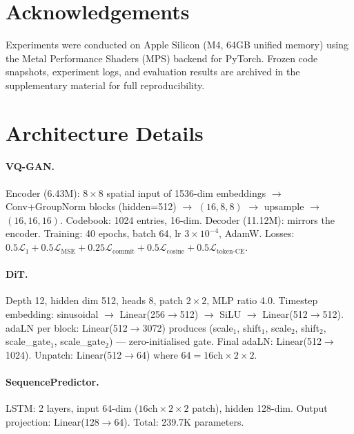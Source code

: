 \documentclass[11pt,a4paper]{article}
\begin{document}
\section*{Acknowledgements}

Experiments were conducted on Apple Silicon (M4, 64GB unified memory) using the
Metal Performance Shaders (MPS) backend for PyTorch.
Frozen code snapshots, experiment logs, and evaluation results are archived in
the supplementary material for full reproducibility.






\appendix

\section{Architecture Details}
\label{app:arch}

\paragraph{VQ-GAN.}
Encoder (6.43M): $8\times 8$ spatial input of 1536-dim embeddings $\to$
Conv+GroupNorm blocks (hidden=512) $\to$ $(16, 8, 8)$ $\to$ upsample $\to$ $(16, 16, 16)$.
Codebook: 1024 entries, 16-dim.
Decoder (11.12M): mirrors the encoder.
Training: 40 epochs, batch 64, lr $3\times10^{-4}$, AdamW.
Losses: $0.5\mathcal{L}_1 + 0.5\mathcal{L}_{\text{MSE}} + 0.25\mathcal{L}_{\text{commit}} + 0.5\mathcal{L}_{\text{cosine}} + 0.5\mathcal{L}_{\text{token-CE}}$.

\paragraph{DiT.}
Depth 12, hidden dim 512, heads 8, patch $2\times 2$, MLP ratio 4.0.
Timestep embedding: sinusoidal $\to$ Linear(256$\to$512) $\to$ SiLU $\to$ Linear(512$\to$512).
adaLN per block: Linear(512$\to$3072) produces (scale$_1$, shift$_1$, scale$_2$, shift$_2$,
scale\_gate$_1$, scale\_gate$_2$) --- zero-initialised gate. Final adaLN: Linear(512$\to$1024).
Unpatch: Linear(512$\to$64) where $64 = 16\text{ch}\times2\times2$.

\paragraph{SequencePredictor.}
LSTM: 2 layers, input 64-dim ($16\text{ch}\times 2\times 2$ patch), hidden 128-dim.
Output projection: Linear(128$\to$64). Total: 239.7K parameters.
\end{document}
